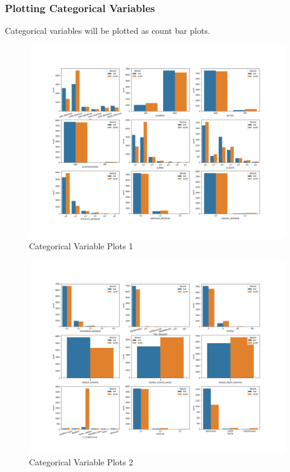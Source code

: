 \documentclass{article}
\begin{document}
\subsubsection{Plotting Categorical Variables}
Categorical variables will be plotted as count bar plots.

\begin{figure}[H]
\centering
\includegraphics[width=\textwidth]{images/categorical_plot_0.png}
\caption{Categorical Variable Plots 1}
\label{fig:categorical1}
\end{figure}

\begin{figure}[H]
\centering
\includegraphics[width=\textwidth]{images/categorical_plot_1.png}
\caption{Categorical Variable Plots 2}
\label{fig:categorical2}
\end{figure}
\end{document}
